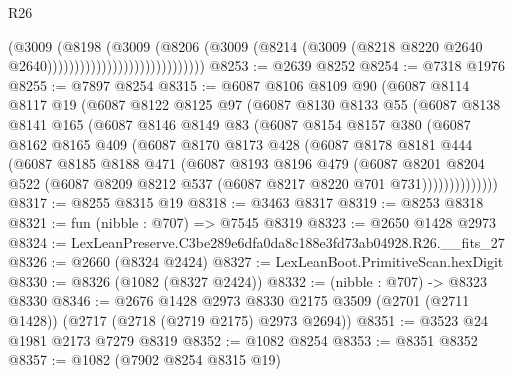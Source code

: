 \begin{lexlean}{R26}
\begin{coremodule}
                                              (@3009
                                                (@8198
                                                  (@3009
                                                    (@8206
                                                      (@3009
                                                        (@8214
                                                          (@3009
                                                            (@8218
                                                              @8220
                                                              @2640
                                                              @2640)))))))))))))))))))))))))))))
@8253 := @2639 @8252
@8254 := @7318 @1976
@8255 := @7897 @8254
@8315 := @6087
    @8106
    @8109
    @90
    (@6087
      @8114
      @8117
      @19
      (@6087
        @8122
        @8125
        @97
        (@6087
          @8130
          @8133
          @55
          (@6087
            @8138
            @8141
            @165
            (@6087
              @8146
              @8149
              @83
              (@6087
                @8154
                @8157
                @380
                (@6087
                  @8162
                  @8165
                  @409
                  (@6087
                    @8170
                    @8173
                    @428
                    (@6087
                      @8178
                      @8181
                      @444
                      (@6087
                        @8185
                        @8188
                        @471
                        (@6087
                          @8193
                          @8196
                          @479
                          (@6087
                            @8201
                            @8204
                            @522
                            (@6087 @8209 @8212 @537 (@6087 @8217 @8220 @701 @731))))))))))))))
@8317 := @8255 @8315 @19
@8318 := @3463 @8317
@8319 := @8253 @8318
@8321 := fun (nibble : @707) => @7545 @8319
@8323 := @2650 @1428 @2973
@8324 := LexLeanPreserve.C3be289e6dfa0da8c188e3fd73ab04928.R26.__fits_27
@8326 := @2660 (@8324 @2424)
@8327 := LexLeanBoot.PrimitiveScan.hexDigit
@8330 := @8326 (@1082 (@8327 @2424))
@8332 := (nibble : @707) -> @8323 @8330
@8346 := @2676
    @1428
    @2973
    @8330
    @2175
    @3509
    (@2701 (@2711 @1428))
    (@2717 (@2718 (@2719 @2175) @2973 @2694))
@8351 := @3523 @24 @1981 @2173 @7279 @8319
@8352 := @1082 @8254
@8353 := @8351 @8352
@8357 := @1082 (@7902 @8254 @8315 @19)

\end{coremodule}
\end{lexlean}
